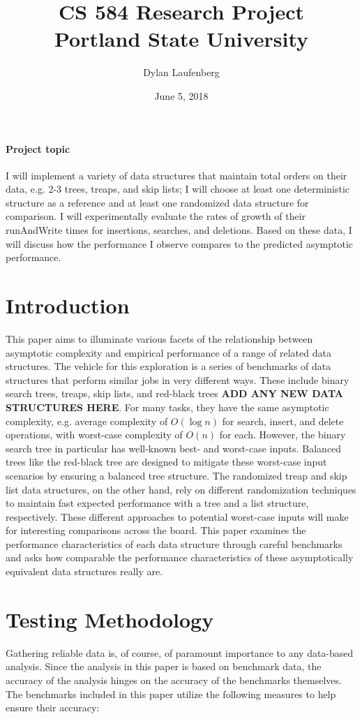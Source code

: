 \documentclass{article}
\title{CS 584 Research Project \\ \large Portland State University}
\author{ Dylan Laufenberg }
\date{June 5, 2018}
\newcommand {\todo}[1] {{\textbf{\color{red}#1}}}
\begin{document}
\maketitle

\paragraph{Project topic} I will implement a variety of data structures that maintain total orders on their data, e.g. 2-3 trees, treaps, and skip lists; I will choose at least one deterministic structure as a reference and at least one randomized data structure for comparison. I will experimentally evaluate the rates of growth of their runAndWrite times for insertions, searches, and deletions. Based on these data, I will discuss how the performance I observe compares to the predicted asymptotic performance.

\section{Introduction}
This paper aims to illuminate various facets of the relationship between asymptotic complexity and empirical performance of a range of related data structures. The vehicle for this exploration is a series of benchmarks of data structures that perform similar jobs in very different ways. These include binary search trees, treaps, skip lists, and red-black trees \todo{ADD ANY NEW DATA STRUCTURES HERE}. For many tasks, they have the same asymptotic complexity, e.g. average complexity of $O(\log n)$ for search, insert, and delete operations, with worst-case complexity of $O(n)$ for each. However, the binary search tree in particular has well-known best- and worst-case inputs. Balanced trees like the red-black tree are designed to mitigate these worst-case input scenarios by ensuring a balanced tree structure. The randomized treap and skip list data structures, on the other hand, rely on different randomization techniques to maintain fast expected performance with a tree and a list structure, respectively. These different approaches to potential worst-case inputs will make for interesting comparisons across the board. This paper examines the performance characteristics of each data structure through careful benchmarks and asks how comparable the performance characteristics of these asymptotically equivalent data structures really are.

\section{Testing Methodology}
Gathering reliable data is, of course, of paramount importance to any data-based analysis. Since the analysis in this paper is based on benchmark data, the accuracy of the analysis hinges on the accuracy of the benchmarks themselves. The benchmarks included in this paper utilize the following measures to help ensure their accuracy:
\end{document}
